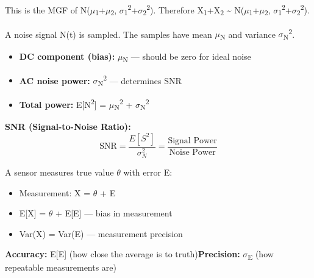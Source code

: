 This is the MGF of N(\ensuremath{\mu}\textsubscript{1}+\ensuremath{\mu}\textsubscript{2}, \ensuremath{\sigma}\textsubscript{1}\textsuperscript{2}+\ensuremath{\sigma}\textsubscript{2}\textsuperscript{2}). Therefore X\textsubscript{1}+X\textsubscript{2} \textasciitilde{} N(\ensuremath{\mu}\textsubscript{1}+\ensuremath{\mu}\textsubscript{2}, \ensuremath{\sigma}\textsubscript{1}\textsuperscript{2}+\ensuremath{\sigma}\textsubscript{2}\textsuperscript{2}).



A noise signal N(t) is sampled. The samples have mean \ensuremath{\mu}\textsubscript{N} and variance \ensuremath{\sigma}\textsubscript{N}\textsuperscript{2}.

\begin{itemize}
\tightlist
\item
  \textbf{DC component (bias):} \ensuremath{\mu}\textsubscript{N} — should be zero for ideal noise
\item
  \textbf{AC noise power:} \ensuremath{\sigma}\textsubscript{N}\textsuperscript{2} — determines SNR
\item
  \textbf{Total power:} E[N\textsuperscript{2}] = \ensuremath{\mu}\textsubscript{N}\textsuperscript{2} + \ensuremath{\sigma}\textsubscript{N}\textsuperscript{2}
\end{itemize}

\textbf{SNR (Signal-to-Noise Ratio):}\PSbr{}\[\text{SNR} = \frac{E[S^2]}{\sigma_N^2} = \frac{\text{Signal Power}}{\text{Noise Power}}\]


A sensor measures true value \ensuremath{\theta} with error E:

\begin{itemize}
\tightlist
\item
  Measurement: X = \ensuremath{\theta} + E
\item
  E[X] = \ensuremath{\theta} + E[E] — bias in measurement
\item
  Var(X) = Var(E) — measurement precision
\end{itemize}

\textbf{Accuracy:} \textbar{}E[E]\textbar{} (how close the average is to truth)\PSbr{}\textbf{Precision:} \ensuremath{\sigma}\textsubscript{E} (how repeatable measurements are)



